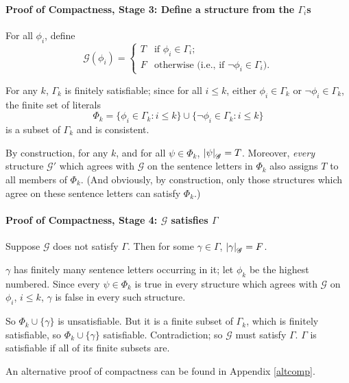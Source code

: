\paragraph{Proof of Compactness, Stage 3: Define a structure from the $\Gamma_{i}$s}

For all $\phi_{i}$, define \begin{equation*}
	\mathscr{G}(\phi_{i}) = \begin{cases}
		T & \text{if } \phi_{i} \in\Gamma_{i};\\
		F & \text{otherwise (i.e., if $\neg\phi_{i}\in\Gamma_{i}$)}.
	\end{cases}
\end{equation*}

For any $k$, $\Gamma_{k}$ is finitely satisfiable; since for all $i\leqslant k$, either $\phi_{i}\in\Gamma_{k}$ or $\neg\phi_{i}\in\Gamma_{k}$, the finite set of literals $$\Phi_{k} = \{\phi_{i}\in\Gamma_{k}:i\leqslant k\}\cup\{\neg\phi_{i}\in\Gamma_{k}:i\leqslant k\}$$
is a subset of $\Gamma_{k}$ and is consistent. 

By construction, for any $k$, and for all $\psi\in\Phi_{k}$, $\left|\psi\right|_{\mathscr{G}}=T$. Moreover, \emph{every} structure $\mathscr{G}'$ which agrees with $\mathscr{G}$ on the sentence letters in $\Phi_{k}$ also assigns $T$ to all members of $\Phi_{k}$.  (And obviously, by construction, only those structures which agree on these sentence letters can satisfy $\Phi_{k}$.)

\paragraph{Proof of Compactness, Stage 4: $\mathscr{G}$ satisfies $\Gamma$}

Suppose $\mathscr{G}$ does not satisfy $\Gamma$.
Then for some $\gamma\in\Gamma$, $\left|\gamma\right|_{\mathscr{G}}=F$.

$\gamma$ has finitely many sentence letters occurring in it; let $\phi_{k}$ be the highest numbered. Since every $\psi\in\Phi_{k}$  is true in every structure which agrees with $\mathscr{G}$ on $\phi_{i}$, $i\leqslant k$, $\gamma$ is false in every such structure.

So $\Phi_{k}\cup\{\gamma\}$ is unsatisfiable. But it is a finite subset of $\Gamma_{k}$, which is finitely satisfiable, so $\Phi_{k}\cup\{\gamma\}$ satisfiable. Contradiction; so $\mathscr{G}$ must satisfy $\Gamma$. $\Gamma$ is satisfiable if all of its finite subsets are.

An alternative proof of compactness can be found in Appendix \ref{altcomp}.


